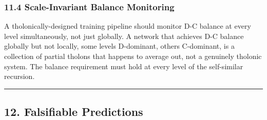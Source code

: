 \documentclass[
  11pt,
  letterpaper,
]{article}
\begin{document}
\subsubsection{11.4 Scale-Invariant Balance
Monitoring}\label{scale-invariant-balance-monitoring}

A tholonically-designed training pipeline should monitor D-C balance at
every level simultaneously, not just globally. A network that achieves
D-C balance globally but not locally, some levels D-dominant, others
C-dominant, is a collection of partial tholons that happens to average
out, not a genuinely tholonic system. The balance requirement must hold
at every level of the self-similar recursion.

\begin{center}\rule{0.5\linewidth}{0.5pt}\end{center}

\subsection{12. Falsifiable Predictions}\label{falsifiable-predictions}
\end{document}
